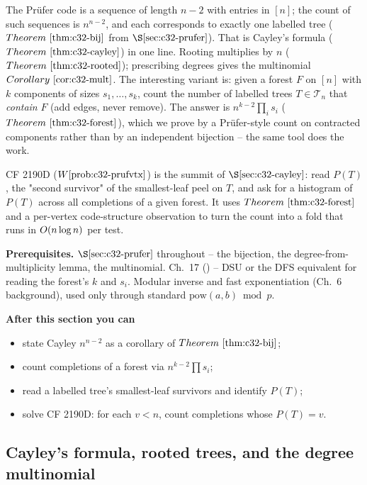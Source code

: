 \begin{topicintro}
The Pr\"ufer code is a sequence of length \(n-2\) with entries in \([n]\); the
count of such sequences is \(n^{n-2}\), and each corresponds to exactly one
labelled tree (\(\thmref{c32-bij}\) from \(\secref{c32-prufer}\)).  That is
Cayley's formula (\(\thmref{c32-cayley}\)) in one line.  Rooting multiplies by
\(n\) (\(\thmref{c32-rooted}\)); prescribing degrees gives the multinomial
\(\corref{c32-mult}\).  The interesting variant is: given a forest \(F\) on
\([n]\) with \(k\) components of sizes \(s_1,\dots,s_k\), count the number of
labelled trees \(T\in\mathcal{T}_n\) that \emph{contain} \(F\) (add edges,
never remove).  The answer is \(n^{k-2}\prod_i s_i\) (\(\thmref{c32-forest}\)),
which we prove by a Pr\"ufer-style count on contracted components rather than
by an independent bijection -- the same tool does the work.

CF 2190D (\(\probref{c32-prufvtx}\)) is the summit of \(\secref{c32-cayley}\):
read \(P(T)\), the "second survivor" of the smallest-leaf peel on \(T\), and
ask for a histogram of \(P(T)\) across all completions of a given forest.  It
uses \(\thmref{c32-forest}\) and a per-vertex code-structure observation to
turn the count into a fold that runs in \(O(n\log n)\) per test.

\textbf{Prerequisites.} \(\secref{c32-prufer}\) throughout -- the bijection,
the degree-from-multiplicity lemma, the multinomial.  Ch.~17 () --
DSU or the DFS equivalent for reading the forest's \(k\) and \(s_i\).
Modular inverse and fast exponentiation (Ch.~6 background), used only through
standard \(\mathrm{pow}(a,b)\bmod p\).

\textbf{After this section you can}
\begin{itemize}[nosep]
  \item state Cayley \(n^{n-2}\) as a corollary of \(\thmref{c32-bij}\); \hfill{}
  \item count completions of a forest via \(n^{k-2}\prod s_i\); \hfill{}
  \item read a labelled tree's smallest-leaf survivors and identify \(P(T)\); \hfill{}
  \item solve CF 2190D: for each \(v<n\), count completions whose \(P(T)=v\). \hfill{}
\end{itemize}
\end{topicintro}

\subsection{Cayley's formula, rooted trees, and the degree multinomial}

